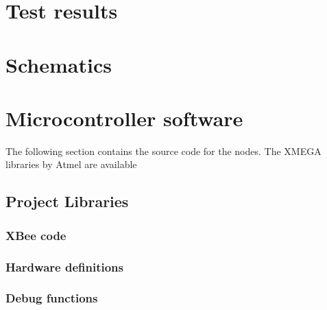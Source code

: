 \section{Test results}




\pagebreak
\appendix

\section{Schematics}

\section{Microcontroller software}
The following section contains the source code for the nodes. The XMEGA
libraries by Atmel are available %



\subsection{Project Libraries}
\label{an:project-libs}

\subsubsection{XBee code}



\subsubsection{Hardware definitions}


\subsubsection{Debug functions}



